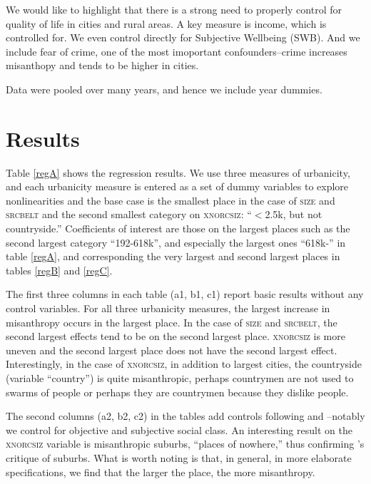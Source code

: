 \documentclass[10pt, letterpaper]{article}
\begin{document}
\begin{spacing}{1.4}
We would like to highlight that there is a strong need to properly control for quality of life in cities and rural areas.  A key measure is income, which is controlled for. We even control directly for Subjective Wellbeing (SWB). And we include fear of crime, one of the most imoportant confounders--crime increases misanthopy and tends to be higher in cities.


Data were pooled over many years, and hence we include year dummies. 

\section*{Results}

Table \ref{regA} shows the regression results. We use three measures of
urbanicity, and each urbanicity measure is entered as a set of dummy variables to
explore nonlinearities and the base case is the smallest place in the case of
\textsc{size} and \textsc{srcbelt} and the second smallest category on \textsc{xnorcsiz}:
 ``$<$2.5k, but not countryside.'' Coefficients of interest are those on the
 largest  places such as the second largest category ``192-618k'', and especially the largest ones ``618k-'' in table
\ref{regA}, and corresponding the very largest and second largest places in tables
\ref{regB} and \ref{regC}.

The first three columns in each table (a1, b1, c1)  report basic results without any control variables. For all three
urbanicity measures, the largest increase in misanthropy occurs in the largest
place. In the case of \textsc{size} and \textsc{srcbelt}, the second largest effects
tend to be on the second largest place. \textsc{xnorcsiz} is more uneven and the
second largest place does not have the second largest effect. Interestingly, in
the case of \textsc{xnorcsiz}, in addition to largest cities,  the countryside (variable ``country'') is quite
misanthropic, perhaps countrymen are not used to swarms of people or perhaps they are countrymen because they dislike people. 

The second columns (a2, b2, c2) in the tables add controls following \citet{welch07} and \citet{smith97}--notably we control for objective and subjective social class. An interesting result on the \textsc{xnorcsiz} variable is misanthropic suburbs, ``places of nowhere,'' thus confirming \citet{kunstler12}'s critique of suburbs.
What is worth noting is that, in general, in more elaborate specifications, we find that the larger the place, the more misanthropy. 


\end{spacing}
\end{document}
